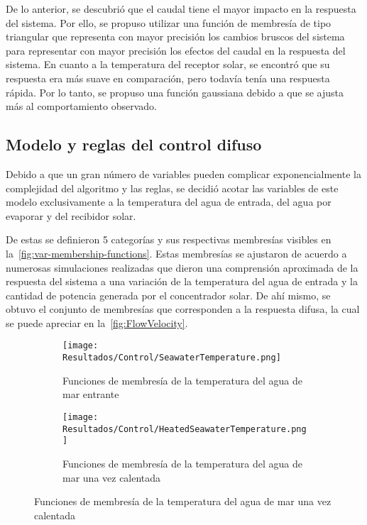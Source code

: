 				De lo anterior, se descubrió que el caudal tiene el mayor impacto en la respuesta del sistema. Por ello, se propuso utilizar una función de membresía de tipo triangular que representa con mayor precisión los cambios bruscos del sistema para representar con mayor precisión los efectos del caudal en la respuesta del sistema. En cuanto a la temperatura del receptor solar, se encontró que su respuesta era más suave en comparación, pero todavía tenía una respuesta rápida. Por lo tanto, se propuso una función gaussiana debido a que se ajusta más al comportamiento observado.
				
		
		\subsection{Modelo y reglas del control difuso}
			
			Debido a que un gran número de variables pueden complicar exponencialmente la complejidad del algoritmo y las reglas, se decidió acotar las variables de este modelo exclusivamente a la temperatura del agua de entrada, del agua por evaporar y del recibidor solar.			
			
			De estas se definieron 5 categorías y sus respectivas membresías visibles en la~\cref{fig:var-membership-functions}. Estas membresías se ajustaron de acuerdo a numerosas simulaciones realizadas que dieron una comprensión aproximada de la respuesta del sistema a una variación de la temperatura del agua de entrada y la cantidad de potencia generada por el concentrador solar. De ahí mismo, se obtuvo el conjunto de membresías que corresponden a la respuesta difusa, la cual se puede apreciar en la~\cref{fig:FlowVelocity}.
			
			\begin{figure}[H]
				\centering
				\begin{subfigure}[t]{0.45\linewidth}
					\centering
					\texttt{[image: Resultados/Control/SeawaterTemperature.png]}
					\caption{Funciones de membresía de la temperatura del agua de mar entrante}
					\label{fig:SeawaterTemperature}
				\end{subfigure}
				\hfill
				\begin{subfigure}[t]{0.45\linewidth}
					\centering
					\texttt{[image: Resultados/Control/HeatedSeawaterTemperature.png]}
					\caption{Funciones de membresía de la temperatura del agua de mar una vez calentada}
					\label{fig:HeatedSeawaterTemperature}
				\end{subfigure}
			\end{figure}
			
